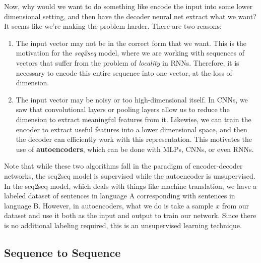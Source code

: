 \documentclass{article}
\theoremstyle{definition}
\theoremstyle{remark}
\theoremstyle{definition}
\begin{document}
Now, why would we want to do something like encode the input into some lower dimensional setting, and then have the decoder neural net extract what we want? It seems like we're making the problem harder. There are two reasons: 
\begin{enumerate}
    \item The input vector may not be in the correct form that we want. This is the motivation for the \textit{seq2seq} model, where we are working with sequences of vectors that suffer from the problem of \textit{locality} in RNNs. Therefore, it is necessary to encode this entire sequence into one vector, at the loss of dimension. 

    \item The input vector may be noisy or too high-dimensional itself. In CNNs, we saw that convolutional layers or pooling layers allow us to reduce the dimension to extract meaningful features from it. Likewise, we can train the encoder to extract useful features into a lower dimensional space, and then the decoder can efficiently work with this representation. This motivates the use of \textbf{autoencoders}, which can be done with MLPs, CNNs, or even RNNs. 
\end{enumerate}

Note that while these two algorithms fall in the paradigm of encoder-decoder networks, the seq2seq model is supervised while the autoencoder is unsupervised. In the seq2seq model, which deals with things like machine translation, we have a labeled dataset of sentences in language A corresponding with sentences in language B. However, in autoencoders, what we do is take a sample $x$ from our dataset and use it both as the input and output to train our network. Since there is no additional labeling required, this is an unsupervised learning technique. 

\subsection{Sequence to Sequence}
\end{document}
